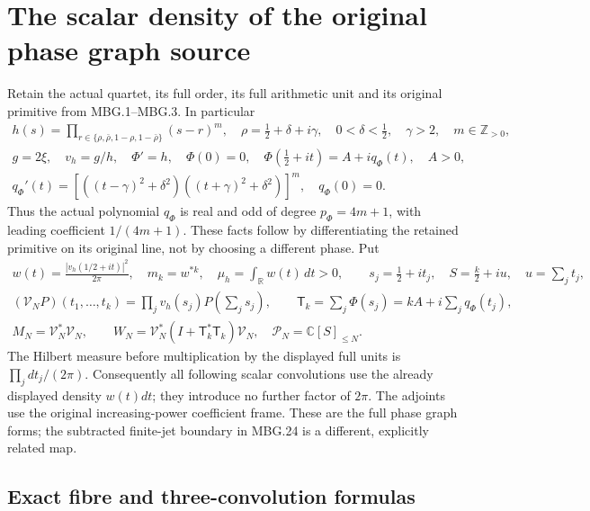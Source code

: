 \section{The scalar density of the original phase graph source}
\label{sec:pgd-density}

Retain the actual quartet, its full order, its full arithmetic unit and its
original primitive from MBG.1--MBG.3. In particular
\[
 \begin{gathered}
 h(s)=\prod_{r\in\{\rho,\bar\rho,1-\rho,1-\bar\rho\}}(s-r)^m,
 \quad \rho=\tfrac12+\delta+i\gamma,\quad
 0<\delta<\tfrac12,\quad \gamma>2,\quad m\in\mathbb Z_{>0},\\
 g=2\xi,\quad v_h=g/h,\quad \Phi'=h,\quad\Phi(0)=0,\quad
 \Phi(\tfrac12+it)=A+iq_\Phi(t),\quad A>0,\\
 q_\Phi'(t)=
 \left[((t-\gamma)^2+\delta^2)((t+\gamma)^2+\delta^2)\right]^m,
 \quad q_\Phi(0)=0.
 \end{gathered}
 \tag{PGD.1}\label{eq:pgd-data}
\]
Thus the actual polynomial \(q_\Phi\) is real and odd of degree
\(p_\Phi=4m+1\), with leading coefficient \(1/(4m+1)\).
These facts follow by differentiating the retained primitive on its
original line, not by choosing a different phase. Put
\[
 \begin{gathered}
 w(t)=\frac{|v_h(1/2+it)|^2}{2\pi},\quad
 m_k=w^{*k},\quad \mu_h=\int_{\mathbb R}w(t)\,dt>0,\qquad
 s_j=\tfrac12+it_j,\quad S=\tfrac k2+iu,\quad u=\sum_jt_j,\\
 (\mathcal V_NP)(t_1,\ldots,t_k)
       =\prod_jv_h(s_j)P\left(\sum_js_j\right),\qquad
 \mathsf T_k=\sum_j\Phi(s_j)=kA+i\sum_jq_\Phi(t_j),\\
 M_N=\mathcal V_N^*\mathcal V_N,\qquad
 W_N=\mathcal V_N^*(I+\mathsf T_k^*\mathsf T_k)\mathcal V_N,
 \quad \mathcal P_N=\mathbb C[S]_{\leq N}.
 \end{gathered}
 \tag{PGD.2}\label{eq:pgd-source}
\]
The Hilbert measure before multiplication by the displayed full units is
\(\prod_jdt_j/(2\pi)\). Consequently all following scalar convolutions
use the already displayed density \(w(t)dt\); they introduce no further
factor of \(2\pi\). The adjoints use the original increasing-power
coefficient frame. These are the full phase graph forms; the subtracted
finite-jet boundary in MBG.24 is a different, explicitly related map.

\subsection{Exact fibre and three-convolution formulas}

